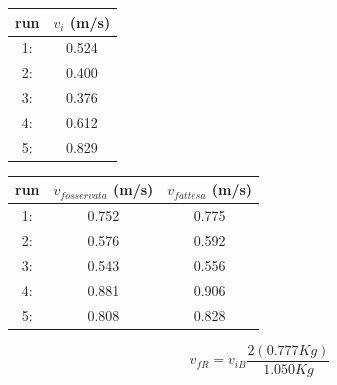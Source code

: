 \documentclass[a4paper]{article}
\theoremstyle{definition}
\begin{document}
\begin{minipage}[c]{0.5\textwidth}
	\captionsetup{labelformat=empty}
	\centering
	\begin{tabular}{||cc||}
		\hline
		\hline
		run &  \(v_{i}\) (m/s)\\
		\hline
		1: & 0.524   \\ 
		2: & 0.400\\
		3: & 0.376\\
		4: & 0.612\\
		5: & 0.829\\
		\hline
		\hline
	\end{tabular}
	
\end{minipage}
\begin{minipage}[c]{0.5\textwidth}
	\captionsetup{labelformat=empty}
	\centering
	\begin{tabular}{||ccc||}
		\hline
		\hline
		run &  \(v_{fosservata}\) (m/s) & \(v_{fattesa}\) (m/s)\\
		\hline
		1: & 0.752 & 0.775 \\
		2: &0.576& 0.592\\
		3: &0.543& 0.556\\
		4: & 0.881& 0.906\\
		5: &0.808& 0.828\\
		\hline
		\hline
	\end{tabular}
\end{minipage}

\[v_{f R} = v_{i B} \frac{2 (0.777 Kg)}{1.050 Kg}\]
\end{document}
